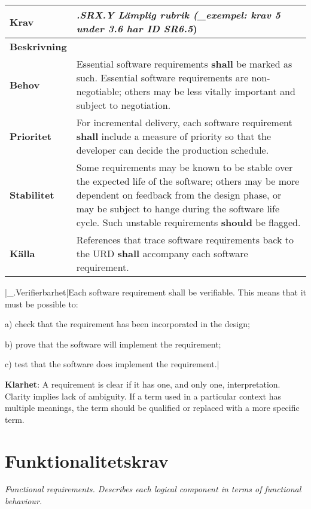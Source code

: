 \documentclass[a4paper, twoside, 11pt, titlepage]{article}
\begin{document}
\begin{tabular} { p{2.6cm} p{12.5cm} }
	\hline
	\sffamily\textbf{Krav} & \emph{.SRX.Y Lämplig rubrik (\_exempel: krav 5 under 3.6 har ID SR6.5})  \\
	\hline
	\sffamily\textbf{Beskrivning} &   \\
	\hline
	\sffamily\textbf{Behov} & Essential software requirements \textbf{shall} be marked as such. Essential software requirements are non-negotiable; others may be less vitally important and subject to negotiation.  \\
	\hline
	\sffamily\textbf{Prioritet} & For incremental delivery, each software requirement \textbf{shall} include a measure of priority so that the developer can decide the production schedule.  \\
	\hline
	\sffamily\textbf{Stabilitet} & Some requirements may be known to be stable over the expected life of the software; others may be more dependent on feedback from the design phase, or may be subject to  hange during the software life cycle. Such unstable requirements \textbf{should} be flagged.  \\
	\hline
	\sffamily\textbf{Källa} & References that trace software requirements back to the URD \textbf{shall} accompany each software requirement.  \\
	\hline
\end{tabular}
\vspace{6mm}

|\_.Verifierbarhet|Each software requirement shall be verifiable. This means that it must be possible to:

a) check that the requirement has been incorporated in the design;

b) prove that the software will implement the requirement;

c) test that the software does implement the requirement.|

\textbf{Klarhet}: A requirement is clear if it has one, and only one, interpretation. Clarity implies lack of ambiguity. If a term used in a particular context has multiple meanings, the term should be qualified or replaced with a more specific term.

\clearpage
\section{Funktionalitetskrav}


\emph{Functional requirements. Describes each logical component in terms of functional behaviour.}
\end{document}
